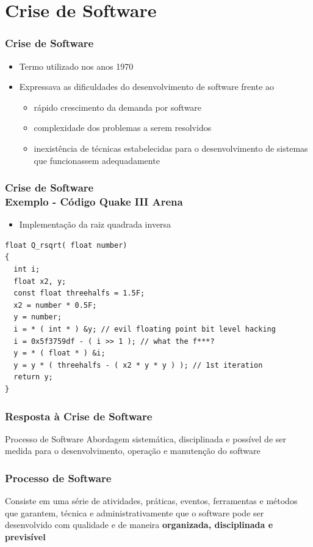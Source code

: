   
\section{Crise de Software}
\begin{frame}
 \frametitle{Crise de Software}
 \begin{itemize}
  \item Termo utilizado nos anos 1970
  \item Expressava as dificuldades do desenvolvimento de software frente ao
  \begin{itemize}
   \item rápido crescimento da demanda por software
   \item   complexidade dos problemas a serem resolvidos
   \item  inexistência de técnicas estabelecidas para o desenvolvimento de sistemas que funcionassem adequadamente
  \end{itemize}
 \end{itemize}
\end{frame}


\begin{frame}[fragile]
 \frametitle{Crise de Software \\ Exemplo - Código Quake III Arena}
 \begin{itemize}
  \item Implementação da raiz quadrada inversa
 \end{itemize}
 \begin{lstlisting}
float Q_rsqrt( float number)
{
  int i;
  float x2, y;
  const float threehalfs = 1.5F;
  x2 = number * 0.5F;
  y = number;
  i = * ( int * ) &y; // evil floating point bit level hacking
  i = 0x5f3759df - ( i >> 1 ); // what the f***?
  y = * ( float * ) &i;
  y = y * ( threehalfs - ( x2 * y * y ) ); // 1st iteration
  return y;
}  
 \end{lstlisting}
\end{frame}

\begin{frame}
\frametitle{Resposta à Crise de Software}
\begin{block}{Processo de Software}
 Abordagem sistemática, disciplinada e possível de
ser medida para o desenvolvimento, operação e manutenção do software
\end{block}
\end{frame}



\begin{frame}
 \frametitle{Processo de Software}
 \begin{block}{}
  Consiste em uma série de atividades, práticas, eventos, ferramentas e
métodos que garantem, técnica e administrativamente que o software
pode ser desenvolvido com qualidade e de maneira \textbf{organizada, disciplinada
e previsível}
 \end{block}
\end{frame}



